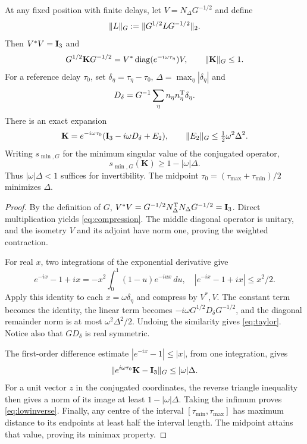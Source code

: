 \begin{theorem}\label{thm:compression}
At any fixed position with finite delays, let $V=N_\Delta G^{-1/2}$ and define
\[
\lVert L\rVert_G:=\lVert G^{1/2}LG^{-1/2}\rVert_2.
\]
Then $V^*V=\mathbf I_3$ and
\begin{equation}\label{eq:compression}
G^{1/2}\mathbf K G^{-1/2}
=V^*\operatorname{diag}(e^{-i\omega\tau_\eta})V,\qquad \lVert\mathbf K\rVert_G\le1.
\end{equation}
For a reference delay $\tau_0$, set $\delta_\eta=\tau_\eta-\tau_0$, $\Delta=\max_\eta|\delta_\eta|$ and
\[
D_\delta=G^{-1}\sum_\eta n_\eta n_\eta^{\mathrm T}\delta_\eta.
\]
There is an exact expansion
\begin{equation}\label{eq:taylor}
\mathbf K=e^{-i\omega\tau_0}(\mathbf I_3-i\omega D_\delta+E_2),
\qquad \lVert E_2\rVert_G\le\tfrac12\omega^2\Delta^2.
\end{equation}
Writing $s_{\min,G}$ for the minimum singular value of the conjugated operator,
\begin{equation}\label{eq:lowinverse}
s_{\min,G}(\mathbf K)\ge1-|\omega|\Delta.
\end{equation}
Thus $|\omega|\Delta<1$ suffices for invertibility. The midpoint $\tau_0=(\tau_{\max}+\tau_{\min})/2$ minimizes $\Delta$.
\end{theorem}
\begin{proof}
By the definition of $G$, $V^*V=G^{-1/2}N_\Delta^{\mathrm T} N_\Delta G^{-1/2}=\mathbf I_3$. Direct multiplication yields \eqref{eq:compression}. The middle diagonal operator is unitary, and the isometry $V$ and its adjoint have norm one, proving the weighted contraction.

For real $x$, two integrations of the exponential derivative give
\[
e^{-ix}-1+ix=-x^2\int_0^1(1-u)e^{-iux}\,du,
\quad |e^{-ix}-1+ix|\le x^2/2.
\]
Apply this identity to each $x=\omega\delta_\eta$ and compress by $V^*,V$. The constant term becomes the identity, the linear term becomes $-i\omega G^{1/2}D_\delta G^{-1/2}$, and the diagonal remainder norm is at most $\omega^2\Delta^2/2$. Undoing the similarity gives \eqref{eq:taylor}. Notice also that $GD_\delta$ is real symmetric.

The first-order difference estimate $|e^{-ix}-1|\le|x|$, from one integration, gives
\[
\lVert e^{i\omega\tau_0}\mathbf K-\mathbf I_3\rVert_G\le|\omega|\Delta.
\]
For a unit vector $z$ in the conjugated coordinates, the reverse triangle inequality then gives a norm of its image at least $1-|\omega|\Delta$. Taking the infimum proves \eqref{eq:lowinverse}. Finally, any centre of the interval $[\tau_{\min},\tau_{\max}]$ has maximum distance to its endpoints at least half the interval length. The midpoint attains that value, proving its minimax property.
\end{proof}


